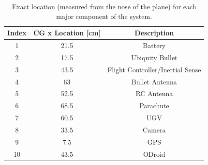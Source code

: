 \documentclass[]{auvsi_doc}
\begin{document}

	\begin{table}[h!]
		\begin{center}
			\caption{Exact location (measured from the nose of the plane) for each major component of the system.}
			\label{table:comps-placement}
			\begin{tabular}{c c c} 
				\toprule
				Index & CG x Location [cm] & Description \\
				\midrule
				1 & 21.5 & Battery \\
				2 & 17.5 & Ubiquity Bullet \\
				3 & 43.5 & Flight Controller/Inertial Sense \\
				4 & 63 & Bullet Antenna \\
				5 & 52.5 & RC Antenna \\
				6 & 68.5 & Parachute \\
				7 & 60.5 & UGV \\
				8 & 33.5 & Camera \\
				9 & 7.5 & GPS \\
				10 & 43.5 &ODroid \\
				\bottomrule
			\end{tabular}
		\end{center}
	\end{table}
\end{document}
